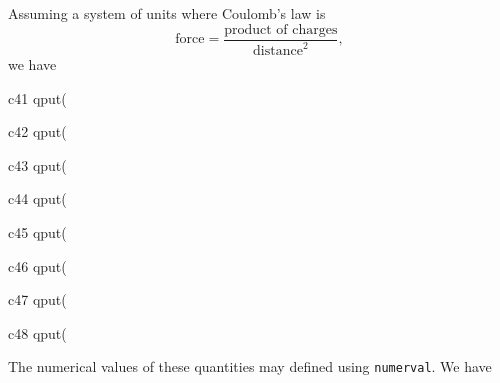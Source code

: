 \documentclass[12pt]{article}
\begin{document}
\vspace{0.1in}





\vspace{0.1in}

\noindent  Assuming a system of units where Coulomb's law is
\[
  \mbox{force} = \frac{\mbox{product of charges}}{\mbox{distance}^2},
\]
we have

\vspace{0.1in}



\begin{mcline}{c41}
qput(%
\end{mcline}

\begin{mcline}{c42}
qput(%
\end{mcline}

\begin{mcline}{c43}
qput(%
\end{mcline}

\begin{mcline}{c44}
qput(%
\end{mcline}

\begin{mcline}{c45}
qput(%
\end{mcline}

\begin{mcline}{c46}
qput(%
\end{mcline}

\begin{mcline}{c47}
qput(%
\end{mcline}

\begin{mcline}{c48}
qput(%
\end{mcline}

\vspace{0.1in}

\noindent  The numerical values of these quantities may 
defined using {\tt numerval}.  We have

\vspace{0.1in}
\end{document}
